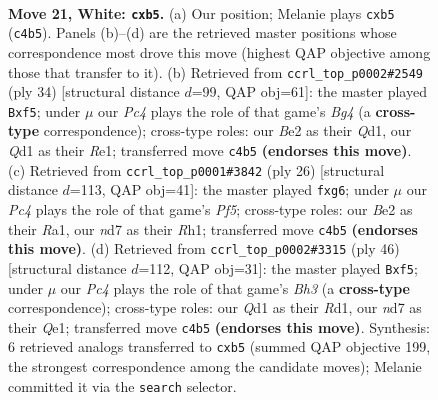 \documentclass[11pt]{article}
\begin{document}
\clearpage

\begin{figure}[p]\centering
\begin{subfigure}{0.46\textwidth}\centering
\resizebox{\linewidth}{!}{%
\newchessgame
\chessboard[
  setfen={rn5r/3nk3/1p2p3/pbq1PpN1/2P2P1p/8/P2KB1PP/R2Q3R w - - 0 21},
  showmover=false,
  pgfstyle=straightmove, color=movearrow, markmove={c4-b5}
]}
\caption{}
\end{subfigure}\hfill
\begin{subfigure}{0.46\textwidth}\centering
\resizebox{\linewidth}{!}{%
\newchessgame
\chessboard[
  setfen={2rq1k1r/3n1p1p/p2P1np1/1p1P1b2/2pN2B1/8/PP3PPP/R2QR1K1 w - - 2 18},
  showmover=false,
  pgfstyle=straightmove, color=movearrow, markmove={g4-f5}
]}
\caption{}
\end{subfigure}
\\[4pt]
\begin{subfigure}{0.46\textwidth}\centering
\resizebox{\linewidth}{!}{%
\newchessgame
\chessboard[
  setfen={r3k2r/ppp1nqbp/2np2p1/5P2/3P1B2/2N2BPP/PPP5/R2Q1K1R w kq - 1 14},
  showmover=false,
  pgfstyle=straightmove, color=movearrow, markmove={f5-g6}
]}
\caption{}
\end{subfigure}\hfill
\begin{subfigure}{0.46\textwidth}\centering
\resizebox{\linewidth}{!}{%
\newchessgame
\chessboard[
  setfen={2k1rn1r/2q1n3/1pp1p3/p1Np1bPp/3P1P2/P3B2B/1PP5/1K1RQ2R w - - 0 24},
  showmover=false,
  pgfstyle=straightmove, color=movearrow, markmove={h3-f5}
]}
\caption{}
\end{subfigure}
\caption{\textbf{Move 21, White: \texttt{cxb5}.} (a) Our position; Melanie plays \texttt{cxb5} (\texttt{c4b5}). Panels (b)--(d) are the retrieved master positions whose correspondence most drove this move (highest QAP objective among those that transfer to it). (b) Retrieved from \texttt{ccrl\_top\_p0002\#2549} (ply 34) [structural distance $d$=99, QAP obj=61]: the master played \texttt{Bxf5}; under $\mu$ our \emph{Pc4} plays the role of that game's \emph{Bg4} (a \textbf{cross-type} correspondence); cross-type roles: our \emph{B}e2 as their \emph{Q}d1, our \emph{Q}d1 as their \emph{R}e1; transferred move \texttt{c4b5} \textbf{(endorses this move)}. (c) Retrieved from \texttt{ccrl\_top\_p0001\#3842} (ply 26) [structural distance $d$=113, QAP obj=41]: the master played \texttt{fxg6}; under $\mu$ our \emph{Pc4} plays the role of that game's \emph{Pf5}; cross-type roles: our \emph{B}e2 as their \emph{R}a1, our \emph{n}d7 as their \emph{R}h1; transferred move \texttt{c4b5} \textbf{(endorses this move)}. (d) Retrieved from \texttt{ccrl\_top\_p0002\#3315} (ply 46) [structural distance $d$=112, QAP obj=31]: the master played \texttt{Bxf5}; under $\mu$ our \emph{Pc4} plays the role of that game's \emph{Bh3} (a \textbf{cross-type} correspondence); cross-type roles: our \emph{Q}d1 as their \emph{R}d1, our \emph{n}d7 as their \emph{Q}e1; transferred move \texttt{c4b5} \textbf{(endorses this move)}. Synthesis: 6 retrieved analogs transferred to \texttt{cxb5} (summed QAP objective 199, the strongest correspondence among the candidate moves); Melanie committed it via the \texttt{search} selector.}
\label{fig:thought-m40}
\end{figure}
\end{document}
